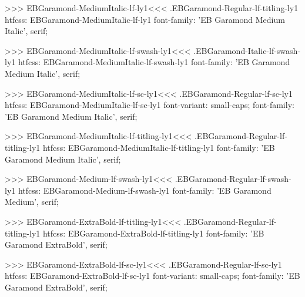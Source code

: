 {{>>>
\<EBGaramond-MediumItalic-lf-ly1\><<<
.EBGaramond-Regular-lf-titling-ly1
htfcss:  EBGaramond-MediumItalic-lf-ly1  font-family: 'EB Garamond Medium Italic', serif;

>>>
\<EBGaramond-MediumItalic-lf-swash-ly1\><<<
.EBGaramond-Italic-lf-swash-ly1
htfcss:  EBGaramond-MediumItalic-lf-swash-ly1  font-family: 'EB Garamond Medium Italic', serif;

>>>
\<EBGaramond-MediumItalic-lf-sc-ly1\><<<
.EBGaramond-Regular-lf-sc-ly1
htfcss:  EBGaramond-MediumItalic-lf-sc-ly1  font-variant: small-caps; font-family: 'EB Garamond Medium Italic', serif;

>>>
\<EBGaramond-MediumItalic-lf-titling-ly1\><<<
.EBGaramond-Regular-lf-titling-ly1
htfcss:  EBGaramond-MediumItalic-lf-titling-ly1  font-family: 'EB Garamond Medium Italic', serif;

>>>
\<EBGaramond-Medium-lf-swash-ly1\><<<
.EBGaramond-Regular-lf-swash-ly1
htfcss:  EBGaramond-Medium-lf-swash-ly1  font-family: 'EB Garamond Medium', serif;

>>>
\<EBGaramond-ExtraBold-lf-titling-ly1\><<<
.EBGaramond-Regular-lf-titling-ly1
htfcss:  EBGaramond-ExtraBold-lf-titling-ly1  font-family: 'EB Garamond ExtraBold', serif;

>>>
\<EBGaramond-ExtraBold-lf-sc-ly1\><<<
.EBGaramond-Regular-lf-sc-ly1
htfcss:  EBGaramond-ExtraBold-lf-sc-ly1  font-variant: small-caps; font-family: 'EB Garamond ExtraBold', serif;

}}
